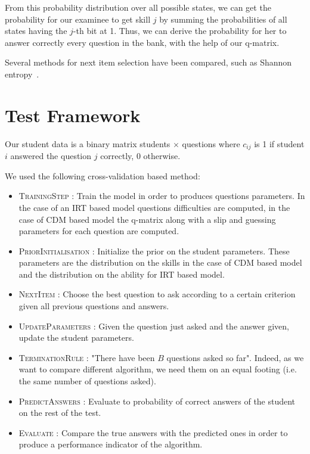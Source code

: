 \documentclass{sig-alternate}
\begin{document}
From this probability distribution over all possible states, we can get the probability for our examinee to get skill $j$ by summing the probabilities of all states having the $j$-th bit at 1. Thus, we can derive the probability for her to answer correctly every question in the bank, with the help of our q-matrix.

Several methods for next item selection have been compared, such as Shannon entropy~\citep{Xu2003}. %


\section{Test Framework}

Our student data is a binary matrix students $\times$ questions where $c_{ij}$ is 1 if student $i$ answered the question $j$ correctly, 0 otherwise. 

We used the following cross-validation based method: 

\begin{itemize}
\item \textsc{TrainingStep} : Train the model in order to produces questions parameters. In the case of an IRT based model questions difficulties are computed, in the case of CDM based model the q-matrix along with a slip and guessing parameters for each question are computed. 
\item \textsc{PriorInitialisation} : Initialize the prior on the student parameters.  These parameters are the distribution on the skills in the case of CDM based model and the distribution on the ability for IRT based model. 
\item \textsc{NextItem} : Choose the best question to ask according to a certain criterion given all previous questions and answers. 
\item \textsc{UpdateParameters} : Given the question just asked and the answer given, update the student parameters.
\item \textsc{TerminationRule} : "There have been $B$ questions asked so far". Indeed, as we want to compare different algorithm, we need them on an equal footing (i.e. the same number of questions asked). 
\item \textsc{PredictAnswers} : Evaluate to probability of correct answers of the student on the rest of the test.
\item \textsc{Evaluate} : Compare the true answers with the predicted ones in order to produce a performance indicator of the algorithm. 
\end{itemize}
\end{document}
